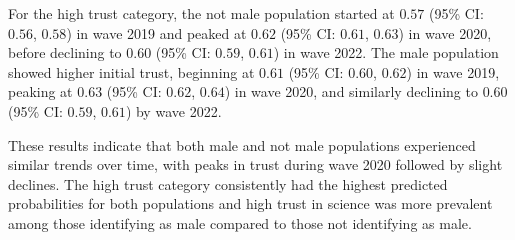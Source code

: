 \documentclass[
  single column]{article}
\begin{document}
For the high trust category, the not male population started at \(0.57\)
(95\% CI: \(0.56\), \(0.58\)) in wave 2019 and peaked at \(0.62\) (95\%
CI: \(0.61\), \(0.63\)) in wave 2020, before declining to \(0.60\) (95\%
CI: \(0.59\), \(0.61\)) in wave 2022. The male population showed higher
initial trust, beginning at \(0.61\) (95\% CI: \(0.60\), \(0.62\)) in
wave 2019, peaking at \(0.63\) (95\% CI: \(0.62\), \(0.64\)) in wave
2020, and similarly declining to \(0.60\) (95\% CI: \(0.59\), \(0.61\))
by wave 2022.

These results indicate that both male and not male populations
experienced similar trends over time, with peaks in trust during wave
2020 followed by slight declines. The high trust category consistently
had the highest predicted probabilities for both populations and high
trust in science was more prevalent among those identifying as male
compared to those not identifying as male.
\end{document}
